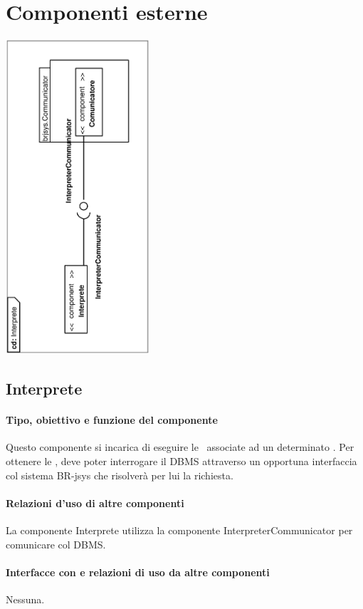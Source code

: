 \documentclass[11pt,titlepage,a4paper]{report}
\begin{document}
\chapter{Componenti esterne}
\begin{center}
 \includegraphics[width=0.4\textwidth, angle=-90]{DiagrammaClassi/Interprete.eps}
\end{center}
\section{Interprete}
\subsubsection{Tipo, obiettivo e funzione del componente}
Questo componente si incarica di eseguire le \brs\ associate ad un determinato \bo. Per ottenere le \brs, deve poter interrogare il DBMS attraverso un opportuna interfaccia col sistema BR-jsys che risolver\`a per lui la richiesta.
\subsubsection{Relazioni d'uso di altre componenti}
La componente Interprete utilizza la componente InterpreterCommunicator per comunicare col DBMS.
\subsubsection{Interfacce con e relazioni di uso da altre componenti}
Nessuna.
\end{document}
